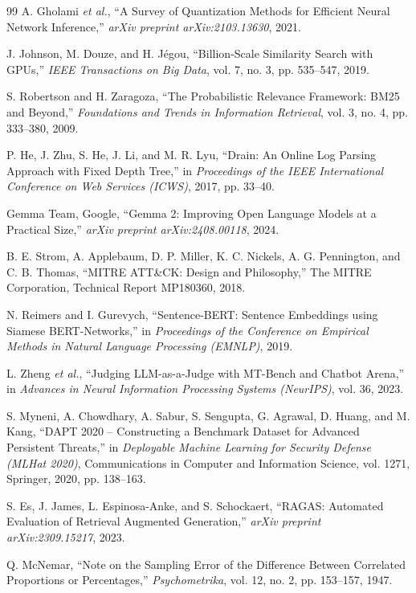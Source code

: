 \documentclass[12pt,a4paper]{report}
\begin{document}
\begin{thebibliography}{99}
A. Gholami \textit{et al.}, ``A Survey of Quantization Methods for Efficient Neural Network Inference,'' \textit{arXiv preprint arXiv:2103.13630}, 2021.

J. Johnson, M. Douze, and H. Jégou, ``Billion-Scale Similarity Search with GPUs,'' \textit{IEEE Transactions on Big Data}, vol. 7, no. 3, pp. 535--547, 2019.

S. Robertson and H. Zaragoza, ``The Probabilistic Relevance Framework: BM25 and Beyond,'' \textit{Foundations and Trends in Information Retrieval}, vol. 3, no. 4, pp. 333--380, 2009.

P. He, J. Zhu, S. He, J. Li, and M. R. Lyu, ``Drain: An Online Log Parsing Approach with Fixed Depth Tree,'' in \textit{Proceedings of the IEEE International Conference on Web Services (ICWS)}, 2017, pp. 33--40.

Gemma Team, Google, ``Gemma 2: Improving Open Language Models at a Practical Size,'' \textit{arXiv preprint arXiv:2408.00118}, 2024.

B. E. Strom, A. Applebaum, D. P. Miller, K. C. Nickels, A. G. Pennington, and C. B. Thomas, ``MITRE ATT\&CK: Design and Philosophy,'' The MITRE Corporation, Technical Report MP180360, 2018.

N. Reimers and I. Gurevych, ``Sentence-BERT: Sentence Embeddings using Siamese BERT-Networks,'' in \textit{Proceedings of the Conference on Empirical Methods in Natural Language Processing (EMNLP)}, 2019.

L. Zheng \textit{et al.}, ``Judging LLM-as-a-Judge with MT-Bench and Chatbot Arena,'' in \textit{Advances in Neural Information Processing Systems (NeurIPS)}, vol. 36, 2023.

S. Myneni, A. Chowdhary, A. Sabur, S. Sengupta, G. Agrawal, D. Huang, and M. Kang, ``DAPT 2020 -- Constructing a Benchmark Dataset for Advanced Persistent Threats,'' in \textit{Deployable Machine Learning for Security Defense (MLHat 2020)}, Communications in Computer and Information Science, vol. 1271, Springer, 2020, pp. 138--163.

S. Es, J. James, L. Espinosa-Anke, and S. Schockaert, ``RAGAS: Automated Evaluation of Retrieval Augmented Generation,'' \textit{arXiv preprint arXiv:2309.15217}, 2023.

Q. McNemar, ``Note on the Sampling Error of the Difference Between Correlated Proportions or Percentages,'' \textit{Psychometrika}, vol. 12, no. 2, pp. 153--157, 1947.


\end{thebibliography}
\end{document}
